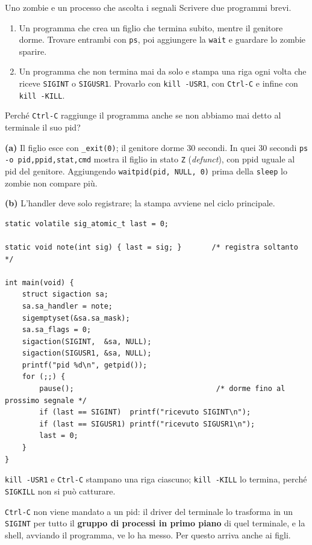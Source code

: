 \begin{esercizio}{Uno zombie e un processo che ascolta i segnali}
Scrivere due programmi brevi.
\begin{enumerate}[label=(\alph*)]
    \item Un programma che crea un figlio che termina subito, mentre il genitore dorme. Trovare entrambi con \texttt{ps},
          poi aggiungere la \texttt{wait} e guardare lo zombie sparire.
    \item Un programma che non termina mai da solo e stampa una riga ogni volta che riceve \texttt{SIGINT} o
          \texttt{SIGUSR1}. Provarlo con \texttt{kill -USR1}, con \texttt{Ctrl-C} e infine con \texttt{kill -KILL}.
\end{enumerate}
Perché \texttt{Ctrl-C} raggiunge il programma anche se non abbiamo mai detto al terminale il suo pid?

\svolgimento
\textbf{(a)} Il figlio esce con \texttt{\_exit(0)}; il genitore dorme 30 secondi. In quei 30 secondi \texttt{ps -o
pid,ppid,stat,cmd} mostra il figlio in stato \texttt{Z} (\emph{defunct}), con ppid uguale al pid del genitore.
Aggiungendo \texttt{waitpid(pid, NULL, 0)} prima della \texttt{sleep} lo zombie non compare più.

\textbf{(b)} L'handler deve solo registrare; la stampa avviene nel ciclo principale.
\begin{lstlisting}[language={[POSIX]C}, style=wnumbers, title={waiter.c}]
static volatile sig_atomic_t last = 0;

static void note(int sig) { last = sig; }       /* registra soltanto */

int main(void) {
    struct sigaction sa;
    sa.sa_handler = note;
    sigemptyset(&sa.sa_mask);
    sa.sa_flags = 0;
    sigaction(SIGINT,  &sa, NULL);
    sigaction(SIGUSR1, &sa, NULL);
    printf("pid %d\n", getpid());
    for (;;) {
        pause();                                 /* dorme fino al prossimo segnale */
        if (last == SIGINT)  printf("ricevuto SIGINT\n");
        if (last == SIGUSR1) printf("ricevuto SIGUSR1\n");
        last = 0;
    }
}
\end{lstlisting}
\texttt{kill -USR1} e \texttt{Ctrl-C} stampano una riga ciascuno; \texttt{kill -KILL} lo termina, perché
\texttt{SIGKILL} non si può catturare.

\texttt{Ctrl-C} non viene mandato a un pid: il driver del terminale lo trasforma in un \texttt{SIGINT} per tutto il
\textbf{gruppo di processi in primo piano} di quel terminale, e la shell, avviando il programma, ve lo ha messo. Per
questo arriva anche ai figli.
\end{esercizio}

